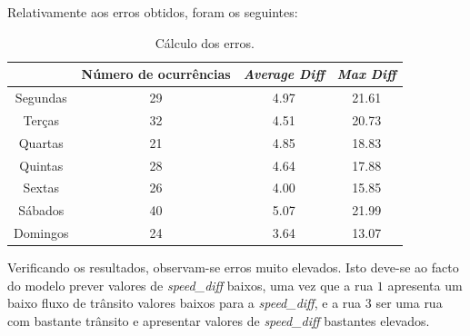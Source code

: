 \documentclass[a4paper, 12pt]{article}
\begin{document}
Relativamente aos erros obtidos, foram os seguintes:

\begin{table}[H]
	\centering
	\begin{tabular}{||c||c|c|c||}
		\hline\hline
		& Número de ocurrências &\textit{Average Diff} & \textit{Max Diff} \\
		\hline\hline
		 Segundas &29 & 4.97
		& 21.61 \\
		\hline
		 Terças  &32&
		4.51
		& 20.73\\
		\hline
		 Quartas & 21&4.85
		
		& 18.83	\\
		\hline
		 Quintas  & 28&
		4.64
		&	17.88\\
		\hline
		 Sextas & 26&
		4.00 & 15.85 \\
		\hline
		 Sábados  &40& 5.07
		& 21.99 \\
		\hline
		 Domingos & 24&
		3.64
		& 13.07
		
		\\
		\hline\hline
	\end{tabular}
	\label{table:mod1_rua3}
	\caption{Cálculo dos erros.}
\end{table}

Verificando os resultados, observam-se erros muito elevados. Isto deve-se ao facto do modelo prever valores de \textit{speed\_diff} baixos, uma vez que a rua $1$ apresenta um baixo fluxo de trânsito valores baixos para a \textit{speed\_diff}, e a rua $3$ ser uma rua com bastante trânsito e apresentar valores de \textit{speed\_diff} bastantes elevados.
\end{document}
